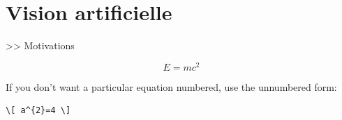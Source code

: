 
\section{Vision artificielle}
>> Motivations

\begin{equation}
E = mc^{2}
\label{eqn:Einstein}
\end{equation}

If you don't want a particular equation numbered, use the unnumbered form:
\begin{verbatim}
\[ a^{2}=4 \]
\end{verbatim}

